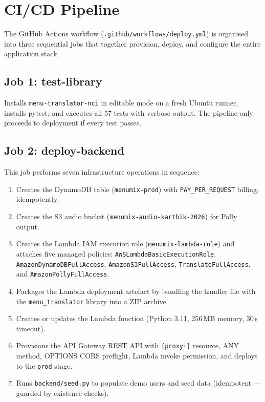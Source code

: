 \documentclass[conference]{IEEEtran}
\begin{document}
\section{CI/CD Pipeline}

The GitHub Actions workflow (\texttt{.github/workflows/deploy.yml}) is organised into three sequential jobs that together provision, deploy, and configure the entire application stack.

\subsection{Job 1: test-library}

Installs \texttt{menu-translator-nci} in editable mode on a fresh Ubuntu runner, installs pytest, and executes all 57 tests with verbose output. The pipeline only proceeds to deployment if every test passes.

\subsection{Job 2: deploy-backend}

This job performs seven infrastructure operations in sequence:

\begin{enumerate}[leftmargin=*]
    \item Creates the DynamoDB table (\texttt{menumix-prod}) with \texttt{PAY\_PER\_REQUEST} billing, idempotently.
    \item Creates the S3 audio bucket (\texttt{menumix-audio-karthik-2026}) for Polly output.
    \item Creates the Lambda IAM execution role (\texttt{menumix-lambda-role}) and attaches five managed policies: \texttt{AWSLambdaBasicExecutionRole}, \texttt{AmazonDynamoDBFullAccess}, \texttt{AmazonS3FullAccess}, \texttt{TranslateFullAccess}, and \texttt{AmazonPollyFullAccess}.
    \item Packages the Lambda deployment artefact by bundling the handler file with the \texttt{menu\_translator} library into a ZIP archive.
    \item Creates or updates the Lambda function (Python 3.11, 256\,MB memory, 30\,s timeout).
    \item Provisions the API Gateway REST API with \texttt{\{proxy+\}} resource, ANY method, OPTIONS CORS preflight, Lambda invoke permission, and deploys to the \texttt{prod} stage.
    \item Runs \texttt{backend/seed.py} to populate demo users and seed data (idempotent --- guarded by existence checks).
\end{enumerate}
\end{document}
